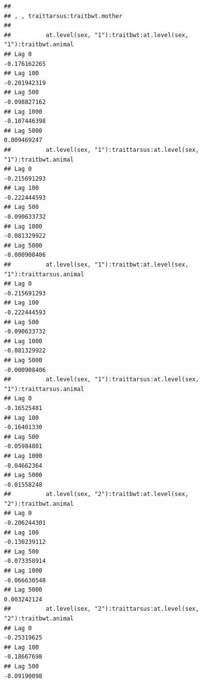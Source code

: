 \documentclass[
  12pt,
]{book}
\begin{document}
\begin{verbatim}
## 
## , , traittarsus:traitbwt.mother
## 
##          at.level(sex, "1"):traitbwt:at.level(sex, "1"):traitbwt.animal
## Lag 0                                                      -0.176162265
## Lag 100                                                    -0.201942319
## Lag 500                                                    -0.098827162
## Lag 1000                                                   -0.107446398
## Lag 5000                                                    0.009469247
##          at.level(sex, "1"):traittarsus:at.level(sex, "1"):traitbwt.animal
## Lag 0                                                         -0.215691293
## Lag 100                                                       -0.222444593
## Lag 500                                                       -0.090633732
## Lag 1000                                                      -0.081329922
## Lag 5000                                                      -0.000908406
##          at.level(sex, "1"):traitbwt:at.level(sex, "1"):traittarsus.animal
## Lag 0                                                         -0.215691293
## Lag 100                                                       -0.222444593
## Lag 500                                                       -0.090633732
## Lag 1000                                                      -0.081329922
## Lag 5000                                                      -0.000908406
##          at.level(sex, "1"):traittarsus:at.level(sex, "1"):traittarsus.animal
## Lag 0                                                             -0.16525481
## Lag 100                                                           -0.16401330
## Lag 500                                                           -0.05984801
## Lag 1000                                                          -0.04662364
## Lag 5000                                                          -0.01558248
##          at.level(sex, "2"):traitbwt:at.level(sex, "2"):traitbwt.animal
## Lag 0                                                      -0.206244301
## Lag 100                                                    -0.130239112
## Lag 500                                                    -0.073358914
## Lag 1000                                                   -0.066630548
## Lag 5000                                                    0.003242124
##          at.level(sex, "2"):traittarsus:at.level(sex, "2"):traitbwt.animal
## Lag 0                                                          -0.25319625
## Lag 100                                                        -0.18667698
## Lag 500                                                        -0.09190098

\end{verbatim}
\end{document}
